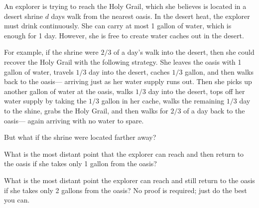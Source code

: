\begin{problem}
An explorer is trying to reach the Holy Grail, which she believes is
located in a desert shrine $d$ days walk from the nearest oasis.  In the
desert heat, the explorer must drink continuously.  She can carry at most
1 gallon of water, which is enough for 1 day.  However, she is free to
create water caches out in the desert.

For example, if the shrine were $2/3$ of a day's walk into the desert,
then she could recover the Holy Grail with the following strategy.
She leaves the oasis with 1 gallon of water, travels $1/3$ day into
the desert, caches $1/3$ gallon, and then walks back to the oasis---
arriving just as her water supply runs out.  Then she picks up another
gallon of water at the oasis, walks $1/3$ day into the desert, tops
off her water supply by taking the $1/3$ gallon in her cache, walks
the remaining $1/3$ day to the shine, grabs the Holy Grail, and then
walks for $2/3$ of a day back to the oasis--- again arriving with no
water to spare.

But what if the shrine were located farther away?

\bparts

\ppart What is the most distant point that the explorer can reach and then
return to the oasis if she takes only 1 gallon from the oasis?


\ppart What is the most distant point the explorer can reach and still
return to the oasis if she takes only 2 gallons from the oasis?  No proof
is required; just do the best you can.



\iffalse
\ppart What about 3 gallons?  \hint First, try to establish a cache of 2
gallons \textit{plus} enough water for the walk home as far into the
desert as possible.  Then use this cache as a springboard for your
solution to the previous part.

\solution{Suppose the explorer makes three
trips $1/6$ day into the desert, dropping $2/3$ gallon off units each
time.  On the third trip, the cache has 2 gallons of water, and the
explorer still has $1/6$ gallon for the trip back home.  So, instead of
returning immediately, she uses the solution described above to
advance another $3/4$ of a day into the desert and then returns home.
Thus, she reaches 
%
\[
\frac{1}{6} + \frac{1}{4} + \frac{1}{2} = \frac{11}{12}
\]
%
of a days' walk into the desert.}
\fi


\end{problem}

